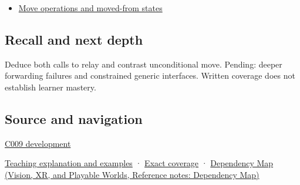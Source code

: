 \begin{itemize}
\tightlist
\item
  \hyperref[appendix-5636651017c2]{Move operations and moved-from states}
\end{itemize}

\subsection{Recall and next depth}\label{appendix-0104b704fb11-recall-and-next-depth}

Deduce both calls to relay and contrast unconditional move. Pending: deeper forwarding failures and constrained generic interfaces. Written coverage does not establish learner mastery.

\subsection{Source and navigation}\label{appendix-0104b704fb11-source-and-navigation}

\hyperref[appendix-fd090d982a15-m009---parts-127-147]{C009 development}

\hyperref[01-foundations-i-ch003-move-permission-is-not-resource-transfer]{Teaching explanation and examples} · \hyperref[appendix-fd090d982a15-m008---parts-113-126]{Exact coverage} · \href{../07-Vision-XR-and-Playable-Worlds/main.pdf\#nameddest=appendix-4ad47bdd269a}{Dependency Map (Vision, XR, and Playable Worlds, Reference notes: Dependency Map)}
